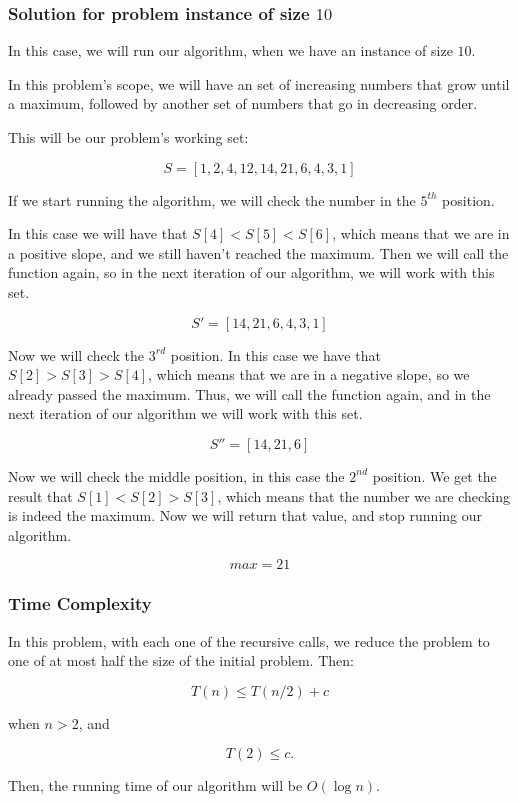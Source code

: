 \documentclass{article}
\begin{document}
\subsubsection*{Solution for problem instance of size $10$}

In this case, we will run our algorithm, when we have an instance of size $10$.

In this problem's scope, we will have an set of increasing numbers that grow until a maximum, followed by another set of numbers that go in decreasing order.

This will be our problem's working set:

$$S = [1,2,4,12,14,21,6,4,3,1]$$

If we start running the algorithm, we will check the number in the $5^{th}$ position.

In this case we will have that $S[4]<S[5]<S[6]$, which means that we are in a positive slope, and we still haven't reached the maximum. Then we will call the function again, so in the next iteration of our algorithm, we will work with this set.

$$S' = [14,21,6,4,3,1]$$

Now we will check the $3^{rd}$ position. In this case we have that $S[2]>S[3]>S[4]$, which means that we are in a negative slope, so we already passed the maximum. Thus, we will call the function again, and in the next iteration of our algorithm we will work with this set.

$$S'' = [14,21,6]$$

Now we will check the middle position, in this case the $2^{nd}$ position. We get the result that $S[1]<S[2]>S[3]$, which means that the number we are checking is indeed the maximum. Now we will return that value, and stop running our algorithm.

$$max = 21$$

\subsubsection*{Time Complexity}

In this problem, with each one of the recursive calls, we reduce the problem to one of at most half the size of the initial problem. Then:

$$T(n)\leq T(n/2) + c$$

when $n>2$, and

$$T(2)\leq c.$$

Then, the running time of our algorithm will be $O(\log n)$.
\end{document}

